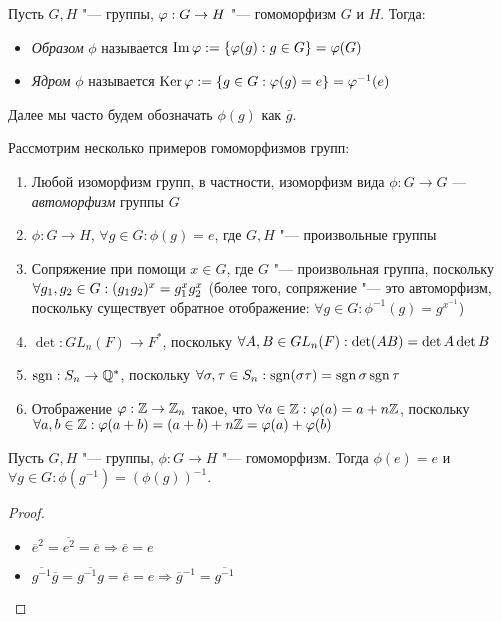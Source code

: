 \begin{definition}
	Пусть $G, H$ "--- группы, $\phi : G \hm\to H$ "--- гомоморфизм $G$ и $H$. Тогда:
	\begin{itemize}
		\item \textit{Образом} $\phi$ называется $\operatorname{Im}\varphi := \{\varphi(g): g \in G\} = \varphi(G)$
		\item \textit{Ядром} $\phi$ называется $\operatorname{Ker}\varphi := \{g \in G: \varphi(g) = e\} = \varphi^{-1}(e)$
	\end{itemize}
\end{definition}

\begin{note}
	Далее мы часто будем обозначать $\phi(g)$ как $\overline{g}$.
\end{note}

\begin{example}
	Рассмотрим несколько примеров гомоморфизмов групп:
	\begin{enumerate}
		\item Любой изоморфизм групп, в частности, изоморфизм вида $\phi: G \to G$ --- \textit{автоморфизм} группы $G$
		\item $\phi: G \to H$, $\forall g \in G: \phi(g) = e$, где $G, H$ "--- произвольные группы
		\item Сопряжение при помощи $x \in G$, где $G$ "--- произвольная группа, поскольку $\forall g_1, g_2 \hm\in G: (g_1g_2)^x = g_1^xg_2^x$ (более того, сопряжение "--- это автоморфизм, поскольку существует обратное отображение: $\forall g \in G: \phi^{-1}(g) = g^{x^{-1}}$)
		\item $\det: GL_n(F) \to F^*$, поскольку $\forall A, B \in GL_n(F): \det(AB) \hm= \det A \det B$
		\item $\operatorname{\mathop{sgn}}: S_n \to \mathbb{Q}^*$, поскольку $\forall \sigma, \tau \in S_n: \sgn(\sigma\tau) \hm= \sgn\sigma\sgn\tau$
		\item Отображение $\varphi: \mathbb{Z} \to \mathbb{Z}_n$ такое, что $\forall a \in \mathbb{Z}: \varphi(a) = a + n\mathbb{Z}$, поскольку $\forall a, b \in \Z: \phi(a + b) \hm= (a + b) + n\Z = \phi(a) + \phi(b)$
	\end{enumerate}
\end{example}

\begin{proposition}
	Пусть $G, H$ "--- группы, $\phi: G \to H$ "--- гомоморфизм. Тогда $\phi(e) = e$ и $\forall g \in G: \phi(g^{-1}) = (\phi(g))^{-1}$.
\end{proposition}

\begin{proof}~
	\begin{itemize}
		\item $\overline{e}^2 = \overline{e^2} = \overline{e} \Rightarrow \overline{e} = e$
		\item $\overline{g^{-1}}\overline{g} = \overline{g^{-1}g} = \overline{e} = e \Rightarrow \overline{g}^{-1} = \overline{g^{-1}}$
	\end{itemize}
\end{proof}

